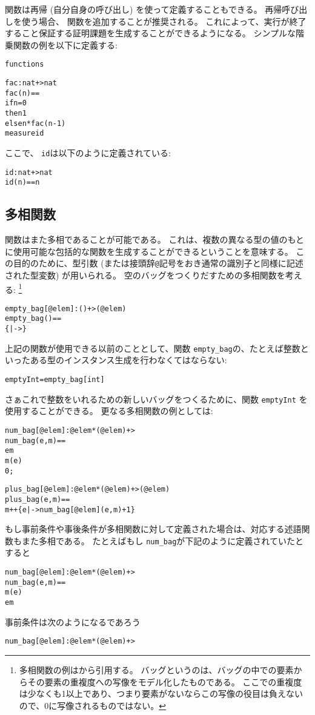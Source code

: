 \documentclass[\pformat,12pt]{jarticle}
\begin{document}
関数は再帰 (自分自身の呼び出し) を使って定義することもできる。
再帰呼び出しを使う場合、 関数を追加することが推奨される。
これによって、実行が終了すること保証する証明課題を生成することができるようになる。
シンプルな階乗関数の例を以下に定義する:

\begin{alltt}
functions

fac: nat +> nat
fac(n) ==
  if n = 0
  then 1
  else n * fac(n - 1)
measure id
\end{alltt}
ここで、 \texttt{id}は以下のように定義されている:
\begin{alltt}
id: nat +> nat
id(n) == n
\end{alltt}

\subsection{多相関数}

関数はまた多相であることが可能である。
これは、複数の異なる型の値のもとに使用可能な包括的な関数を生成することができるということを意味する。
この目的のために、型引数 (または接頭辞{\tt @}記号をおき通常の識別子と同様に記述された型変数) が用いられる。
空のバッグをつくりだすための多相関数を考える:
\footnote{多相関数の例は\cite{Dawes91}から引用する。
バッグというのは、バッグの中での要素からその要素の重複度への写像をモデル化したものである。 
ここでの重複度は少なくも1以上であり、つまり要素がないならこの写像の役目は負えないので、0に写像されるものではない。}
\begin{alltt}
  empty_bag[@elem] : () +> ( @elem )
  empty_bag() ==
    \{ |-> \}
\end{alltt}
上記の関数が使用できる以前のこととして、関数 {\tt empty\_bag}の、たとえば整数といったある型のインスタンス生成を行わなくてはならない:
\begin{alltt}
  emptyInt = empty_bag[int]
\end{alltt}
さぁこれで整数をいれるための新しいバッグをつくるために、関数 {\tt emptyInt} を使用することができる。
更なる多相関数の例としては:
\begin{alltt}
  num_bag[@elem] : @elem * ( @elem ) +> 
  num_bag(e, m) ==
     e  m
     m(e)
     0;

  plus_bag[@elem] : @elem * ( @elem ) +> ( @elem )
  plus_bag(e, m) ==
    m ++ \{ e |-> num_bag[@elem](e, m) + 1 \}
\end{alltt} 
もし事前条件や事後条件が多相関数に対して定義された場合は、対応する述語関数もまた多相である。
たとえばもし \texttt{num\_bag}が下記のように定義されていたとすると
\begin{alltt}
  num_bag[@elem] : @elem * ( @elem ) +> 
  num_bag(e, m) ==
    m(e)
   e  m
\end{alltt}
事前条件は次のようになるであろう
\begin{alltt}
  num_bag[@elem] :@elem * ( @elem ) +> 
\end{alltt}
\end{document}
